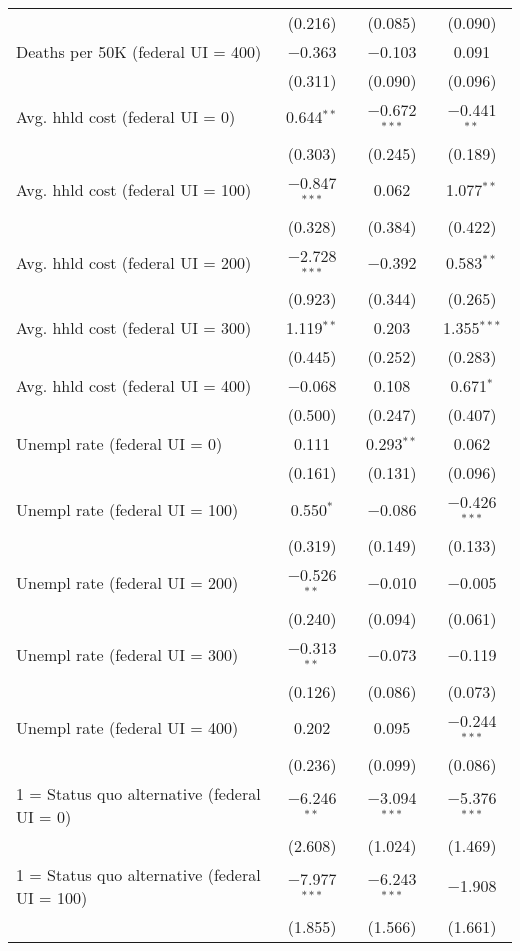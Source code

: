 \begin{table}[!htbp]
\begin{tabular}{@{\extracolsep{5pt}}lccc}
  & (0.216) & (0.085) & (0.090) \\ 
  Deaths per 50K (federal UI = 400) & $-$0.363 & $-$0.103 & 0.091 \\ 
  & (0.311) & (0.090) & (0.096) \\ 
  Avg. hhld cost (federal UI = 0) & 0.644$^{**}$ & $-$0.672$^{***}$ & $-$0.441$^{**}$ \\ 
  & (0.303) & (0.245) & (0.189) \\ 
  Avg. hhld cost (federal UI = 100) & $-$0.847$^{***}$ & 0.062 & 1.077$^{**}$ \\ 
  & (0.328) & (0.384) & (0.422) \\ 
  Avg. hhld cost (federal UI = 200) & $-$2.728$^{***}$ & $-$0.392 & 0.583$^{**}$ \\ 
  & (0.923) & (0.344) & (0.265) \\ 
  Avg. hhld cost (federal UI = 300) & 1.119$^{**}$ & 0.203 & 1.355$^{***}$ \\ 
  & (0.445) & (0.252) & (0.283) \\ 
  Avg. hhld cost (federal UI = 400) & $-$0.068 & 0.108 & 0.671$^{*}$ \\ 
  & (0.500) & (0.247) & (0.407) \\ 
  Unempl rate (federal UI = 0) & 0.111 & 0.293$^{**}$ & 0.062 \\ 
  & (0.161) & (0.131) & (0.096) \\ 
  Unempl rate (federal UI = 100) & 0.550$^{*}$ & $-$0.086 & $-$0.426$^{***}$ \\ 
  & (0.319) & (0.149) & (0.133) \\ 
  Unempl rate (federal UI = 200) & $-$0.526$^{**}$ & $-$0.010 & $-$0.005 \\ 
  & (0.240) & (0.094) & (0.061) \\ 
  Unempl rate (federal UI = 300) & $-$0.313$^{**}$ & $-$0.073 & $-$0.119 \\ 
  & (0.126) & (0.086) & (0.073) \\ 
  Unempl rate (federal UI = 400) & 0.202 & 0.095 & $-$0.244$^{***}$ \\ 
  & (0.236) & (0.099) & (0.086) \\ 
  1 = Status quo alternative (federal UI = 0) & $-$6.246$^{**}$ & $-$3.094$^{***}$ & $-$5.376$^{***}$ \\ 
  & (2.608) & (1.024) & (1.469) \\ 
  1 = Status quo alternative (federal UI = 100) & $-$7.977$^{***}$ & $-$6.243$^{***}$ & $-$1.908 \\ 
  & (1.855) & (1.566) & (1.661) \\ 

\end{tabular}
\end{table}
